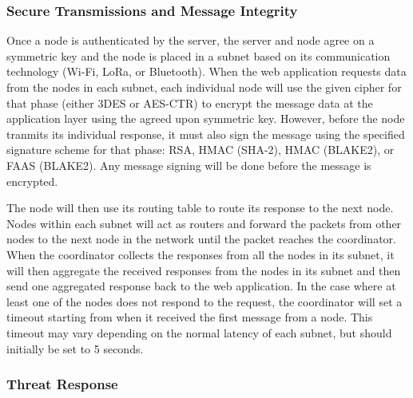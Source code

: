 \documentclass[tikz,a4paper,titlepage]{article}
\begin{document}
\subsubsection{Secure Transmissions and Message Integrity}

Once a node is authenticated by the server, the server and node agree on a symmetric key and the node is placed in a subnet based on its communication technology (Wi-Fi, LoRa, or Bluetooth). When the web application requests data from the nodes in each subnet, each individual node will use the given cipher for that phase (either 3DES or AES-CTR) to encrypt the message data at the application layer using the agreed upon symmetric key. However, before the node tranmits its individual response, it must also sign the message using the specified signature scheme for that phase: RSA, HMAC (SHA-2), HMAC (BLAKE2), or FAAS (BLAKE2). Any message signing will be done before the message is encrypted.

The node will then use its routing table to route its response to the next node. Nodes within each subnet will act as routers and forward the packets from other nodes to the next node in the network until the packet reaches the coordinator. When the coordinator collects the responses from all the nodes in its subnet, it will then aggregate the received responses from the nodes in its subnet and then send one aggregated response back to the web application. In the case where at least one of the nodes does not respond to the request, the coordinator will set a timeout starting from when it received the first message from a node. This timeout may vary depending on the normal latency of each subnet, but should initially be set to 5 seconds.

\subsubsection{Threat Response}

\end{document}
